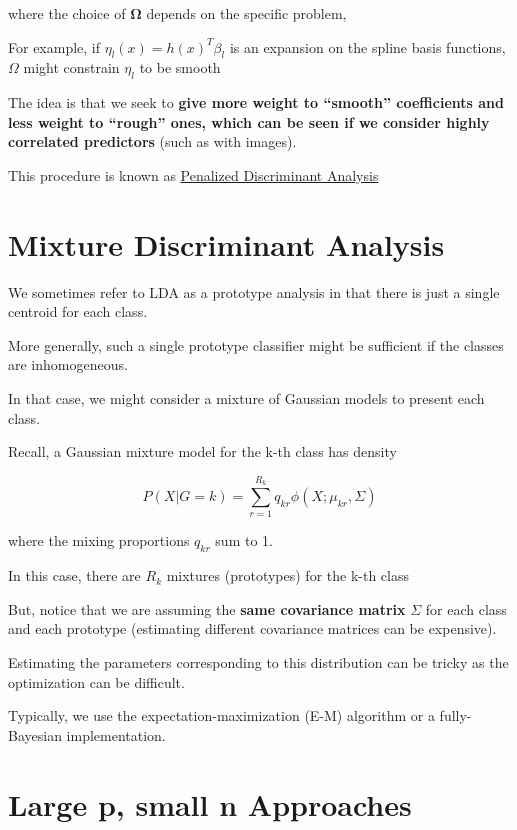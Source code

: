 \documentclass[
]{book}
\begin{document}
where the choice of \(\mathbf{\Omega}\) depends on the specific problem,

For example, if \(\eta_l(x) = h(x)^T \beta_l\) is an expansion on the spline basis functions, \(\Omega\) might constrain \(\eta_l\) to be smooth

The idea is that we seek to \textbf{give more weight to ``smooth'' coefficients and less weight to ``rough'' ones, which can be seen if we consider highly correlated predictors} (such as with images).

This procedure is known as \protect\hyperlink{penalized-discriminant-analysis}{Penalized Discriminant Analysis}

\hypertarget{mixture-discriminant-analysis}{%
\section{Mixture Discriminant Analysis}\label{mixture-discriminant-analysis}}

We sometimes refer to LDA as a prototype analysis in that there is just a single centroid for each class.

More generally, such a single prototype classifier might be sufficient if the classes are inhomogeneous.

In that case, we might consider a mixture of Gaussian models to present each class.

Recall, a Gaussian mixture model for the k-th class has density

\[
P(X|G= k ) = \sum_{r=1}^{R_k} q_{kr} \phi(X; \mu_{kr}, \Sigma)
\]

where the mixing proportions \(q_{kr}\) sum to 1.

In this case, there are \(R_k\) mixtures (prototypes) for the k-th class

But, notice that we are assuming the \textbf{same covariance matrix} \(\Sigma\) for each class and each prototype (estimating different covariance matrices can be expensive).

Estimating the parameters corresponding to this distribution can be tricky as the optimization can be difficult.

Typically, we use the expectation-maximization (E-M) algorithm \citep[ 12.7]{hastie2001a} or a fully-Bayesian implementation.

\hypertarget{large-p-small-n-approaches}{%
\section{Large p, small n Approaches}\label{large-p-small-n-approaches}}
\end{document}
